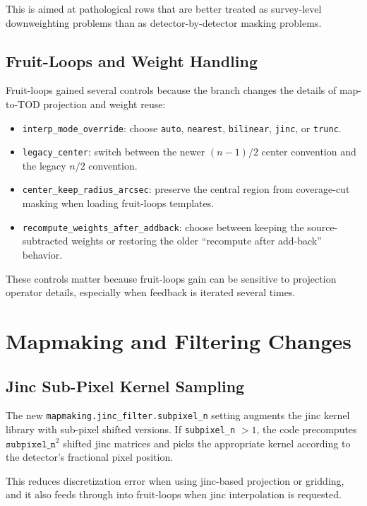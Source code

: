 \documentclass[11pt]{article}
\begin{document}
This is aimed at pathological rows that are better treated as survey-level
downweighting problems than as detector-by-detector masking problems.

\subsection{Fruit-Loops and Weight Handling}

Fruit-loops gained several controls because the branch changes the details of
map-to-TOD projection and weight reuse:

\begin{itemize}[leftmargin=1.5em]
\item \texttt{interp\_mode\_override}: choose \texttt{auto},
\texttt{nearest}, \texttt{bilinear}, \texttt{jinc}, or \texttt{trunc}.
\item \texttt{legacy\_center}: switch between the newer \((n-1)/2\) center
convention and the legacy \(n/2\) convention.
\item \texttt{center\_keep\_radius\_arcsec}: preserve the central region from
coverage-cut masking when loading fruit-loops templates.
\item \texttt{recompute\_weights\_after\_addback}: choose between keeping the
source-subtracted weights or restoring the older ``recompute after add-back''
behavior.
\end{itemize}

These controls matter because fruit-loops gain can be sensitive to projection
operator details, especially when feedback is iterated several times.

\section{Mapmaking and Filtering Changes}

\subsection{Jinc Sub-Pixel Kernel Sampling}

The new \texttt{mapmaking.jinc\_filter.subpixel\_n} setting augments the jinc
kernel library with sub-pixel shifted versions. If \texttt{subpixel\_n} \(> 1\),
the code precomputes \(\texttt{subpixel\_n}^2\) shifted jinc matrices and picks
the appropriate kernel according to the detector's fractional pixel position.

This reduces discretization error when using jinc-based projection or gridding,
and it also feeds through into fruit-loops when jinc interpolation is requested.
\end{document}
